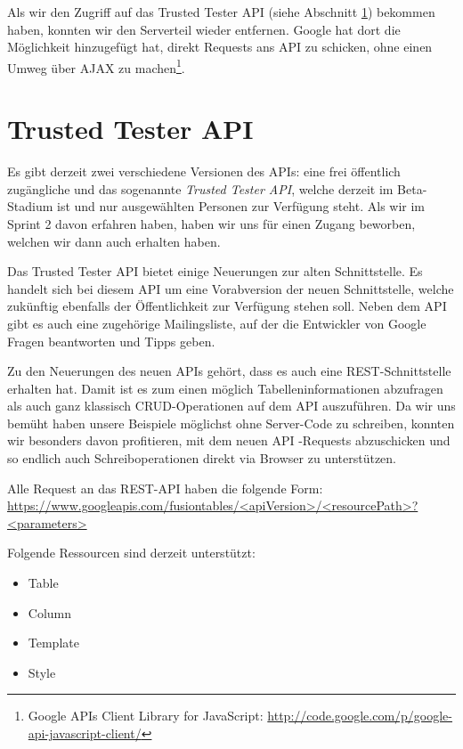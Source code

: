 Als wir den Zugriff auf das Trusted Tester \gls{API} (siehe Abschnitt \ref{trusted-tester-api}) bekommen haben, konnten wir den Serverteil wieder entfernen. Google hat dort die Möglichkeit hinzugefügt hat, direkt Requests ans \gls{API} zu schicken, ohne einen Umweg über \gls{AJAX}  zu machen\footnote{Google \gls{API}s Client Library for JavaScript: \url{http://code.google.com/p/google-api-javascript-client/}}.

\section{Trusted Tester API}
\label{trusted-tester-api}
Es gibt derzeit zwei verschiedene Versionen des \gls{API}s: eine frei öffentlich zugängliche und das sogenannte \emph{Trusted Tester \gls{API}}, welche derzeit im Beta-Stadium ist und nur ausgewählten Personen zur Verfügung steht. Als wir im Sprint 2 davon erfahren haben, haben wir uns für einen Zugang beworben, welchen wir dann auch erhalten haben.

Das Trusted Tester \gls{API} bietet einige Neuerungen zur alten Schnittstelle. Es handelt sich bei diesem \gls{API} um eine Vorabversion der neuen Schnittstelle, welche zukünftig ebenfalls der Öffentlichkeit zur Verfügung stehen soll. Neben dem \gls{API} gibt es auch eine zugehörige Mailingsliste, auf der die Entwickler von Google Fragen beantworten und Tipps geben.

Zu den Neuerungen des neuen \gls{API}s gehört, dass es auch eine \gls{REST}-Schnittstelle erhalten hat. Damit ist es zum einen möglich Tabelleninformationen abzufragen als auch ganz klassisch CRUD-Operationen auf dem \gls{API} auszuführen. Da wir uns bemüht haben unsere Beispiele möglichst ohne Server-Code zu schreiben, konnten wir besonders davon profitieren, mit dem neuen \gls{API} -Requests abzuschicken und so endlich auch Schreiboperationen direkt via Browser zu unterstützen.

Alle Request an das \gls{REST}-\gls{API} haben die folgende Form: \\
\url{https://www.googleapis.com/fusiontables/<apiVersion>/<resourcePath>?<parameters>}

Folgende Ressourcen sind derzeit unterstützt:
\begin{itemize}
	\item Table
	\item Column
	\item Template
	\item Style
\end{itemize}

